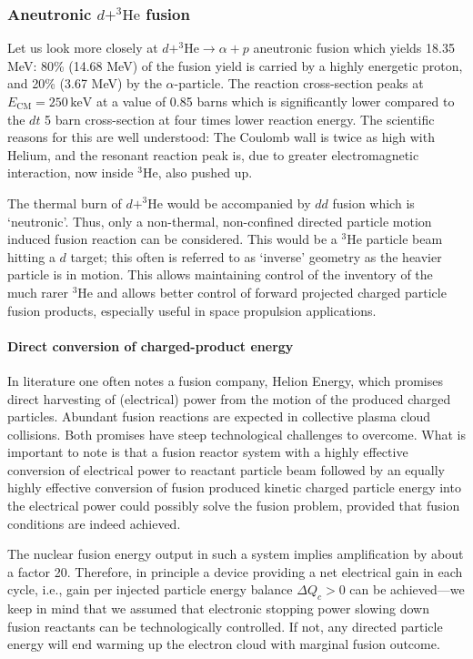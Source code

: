 \documentclass[particles,article,accept,pdftex,moreauthors]{Definitions/mdpi}
\begin{document}
\subsubsection{Aneutronic \texorpdfstring{{$d+^{3\!}\mathrm{He}$}}{d+3He} fusion}\label{sssec:d3Hefuesion}
Let us look more closely at $d+^{3\!}\mathrm{He}\to \alpha+p$ aneutronic fusion which yields 18.35 MeV: 80\% (14.68 MeV) of the fusion yield is carried by a highly energetic proton, and 20\% (3.67 MeV) by the $\alpha$-particle. The reaction cross-section peaks at $E_\mathrm{CM}=250\,\mathrm{keV}$ at a value of 0.85 barns which is significantly lower compared to the $dt$ 5 barn cross-section at four times lower reaction energy. The scientific reasons for this are well understood: The Coulomb wall is twice as high with Helium, and the resonant reaction peak is, due to greater electromagnetic interaction, now inside ${}^3\mathrm{He}$, also pushed up.

The thermal burn of $d+^{3\!}\mathrm{He}$ would be accompanied by $dd$ fusion which is `neutronic'. Thus, only a non-thermal, non-confined directed particle motion induced fusion reaction can be considered. This would be a ${}^3\mathrm{He}$ particle beam hitting a $d$ target; this often is referred to as `inverse' geometry as the heavier particle is in motion. This allows maintaining control of the inventory of the much rarer ${}^3\mathrm{He}$ and allows better control of forward projected charged particle fusion products, especially useful in space propulsion applications.

\paragraph*{\bf Direct conversion of charged-product energy}
In literature one often notes a fusion company, Helion Energy, which promises direct harvesting of (electrical) power from the motion of the produced charged particles. Abundant fusion reactions are expected in collective plasma cloud collisions. Both promises have steep technological challenges to overcome. What is important to note is that a fusion reactor system with a highly effective conversion of electrical power to reactant particle beam followed by an equally highly effective conversion of fusion produced kinetic charged particle energy into the electrical power could possibly solve the fusion problem, provided that fusion conditions are indeed achieved.

The nuclear fusion energy output in such a system implies amplification by about a factor 20. Therefore, in principle a device providing a net electrical gain in each cycle, i.e., gain per injected particle energy balance $\Delta Q_c>0$ can be achieved---we keep in mind that we assumed that electronic stopping power slowing down fusion reactants can be technologically controlled. If not, any directed particle energy will end warming up the electron cloud with marginal fusion outcome.
\end{document}

